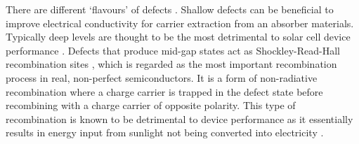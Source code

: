 \documentclass[11pt, twoside]{report}
\begin{document}
There are different `flavours' of defects \cite{Aron_defect_tolerance}. Shallow defects can be beneficial to improve electrical conductivity for carrier extraction from an absorber materials. Typically deep levels are thought to be the most detrimental to solar cell device performance \cite{Stoneham_killer_defects}. 
Defects that produce mid-gap states act as Shockley-Read-Hall recombination sites \cite{SRH}, which is regarded as the most important recombination process in real, non-perfect semiconductors. It is a form of non-radiative recombination where a charge carrier is trapped in the defect state before recombining with a charge carrier of opposite polarity. This type of recombination is known to be detrimental to device performance as it essentially results in energy input from sunlight not being converted into electricity \cite{Nelson4}.

\end{document}
